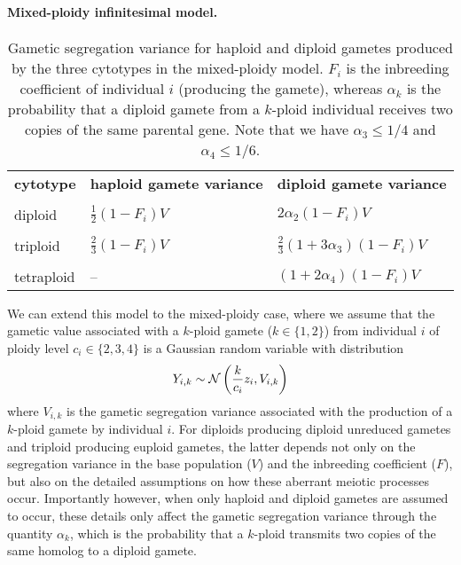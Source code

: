 \documentclass[11pt,a4paper]{article}
\begin{document}
\paragraph{Mixed-ploidy infinitesimal model.}

\begin{table}[t]
\caption{Gametic segregation variance for haploid and diploid gametes produced
by the three cytotypes in the mixed-ploidy model. $F_i$ is the inbreeding
coefficient of individual $i$ (producing the gamete), whereas $\alpha_k$ is the
probability that a diploid gamete from a $k$-ploid individual receives two
copies of the same parental gene. Note that we have $\alpha_3 \le 1/4$ and
$\alpha_4 \le 1/6$.
} \label{tbl:segvar}
\centering
\small
\begin{tabularx}{\linewidth}{XXX}
\cline{1-3}
\textbf{cytotype}   & \textbf{haploid gamete variance} & \textbf{diploid gamete
variance}        \\ \cline{1-3} \\[-2.5ex]
diploid    & $\frac{1}{2}(1-F_i)V$    & $2\alpha_2(1-F_i)V$  \\ \\[-2.5ex]
triploid   & $\frac{2}{3}(1-F_i)V$     & $\frac{2}{3}(1 + 3\alpha_3)(1-F_i)V$ \\ \\[-2.5ex]
tetraploid & --                      & $(1+2\alpha_4)(1-F_i)V$             \\
\cline{1-3}
\end{tabularx}%
\end{table}


We can extend this model to the mixed-ploidy case, where we assume that the
gametic value associated with a $k$-ploid gamete ($k \in \{1,2\}$) from
individual $i$ of ploidy level $c_i \in \{2,3,4\}$ is a Gaussian random
variable with distribution
  $$Y_{i,k} \sim \mathcal{N}\left(\frac{k}{c_i}z_i, V_{i,k}\right)$$
where $V_{i,k}$ is the gametic segregation variance associated with the
production of a $k$-ploid gamete by individual $i$.
For diploids producing diploid unreduced gametes and triploid producing euploid
gametes, the latter depends not only on the segregation variance in the base
population ($V$) and the inbreeding coefficient ($F$), but also on the detailed
assumptions on how these aberrant meiotic processes occur.
Importantly however, when only haploid and diploid gametes are assumed to occur,
these details only affect the gametic segregation variance through the quantity
$\alpha_k$, which is the probability that a $k$-ploid transmits two copies of 
the same homolog to a diploid gamete.
\end{document}

